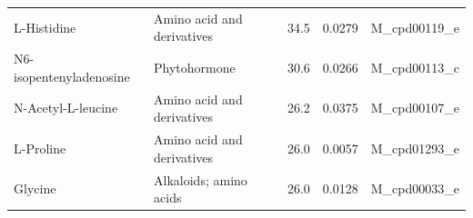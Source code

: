 \documentclass[10pt, a4paper, twocolumn]{ctexart}
\begin{document}
\begin{table}[htbp]
\begin{tabularx}{\textwidth}{lXrrp{3.0cm}}
L-Histidine                   & Amino acid and derivatives       &   34.5 & 0.0279 & M\_cpd00119\_e \\
N6-isopentenyladenosine       & Phytohormone                     &   30.6 & 0.0266 & M\_cpd00113\_c \\
N-Acetyl-L-leucine            & Amino acid and derivatives       &   26.2 & 0.0375 & M\_cpd00107\_e \\
L-Proline                     & Amino acid and derivatives       &   26.0 & 0.0057 & M\_cpd01293\_e \\
Glycine                       & Alkaloids; amino acids           &   26.0 & 0.0128 & M\_cpd00033\_e \\
\bottomrule
\end{tabularx}
\end{table}
\end{document}
